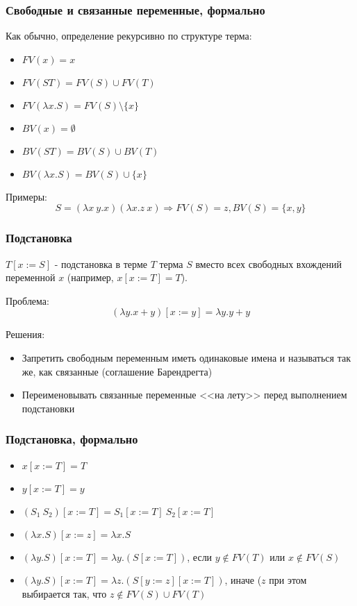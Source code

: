 \documentclass[xetex,mathserif,serif]{beamer}
\begin{document}
	\begin{frame}
		\frametitle{Свободные и связанные переменные, формально}
		Как обычно, определение рекурсивно по структуре терма:
		\begin{itemize}
			\item $FV(x) = x$
			\item $FV(S T) = FV(S) \cup FV(T)$
			\item $FV(\lambda x.S) = FV(S) \setminus \{x\}$
		\end{itemize}

		\begin{itemize}
			\item $BV(x) = \emptyset$
			\item $BV(S T) = BV(S) \cup BV(T)$
			\item $BV(\lambda x.S) = BV(S) \cup \{x\}$
		\end{itemize}
		Примеры:
		$$S = (\lambda x\ y.x) (\lambda x.z\ x) \Rightarrow FV(S) = {z}, BV(S) = \{x,y\}$$
	\end{frame}
	
	\begin{frame}
		\frametitle{Подстановка}
		$T[x := S]$ - подстановка в терме $T$ терма $S$ вместо всех свободных вхождений 
		переменной $x$ (например, $x[x := T] = T$).
		
		Проблема:
		$$(\lambda y.x + y)[x := y] = \lambda y. y + y$$
		
		Решения:
		\begin{itemize}
			\item Запретить свободным переменным иметь одинаковые имена и называться так же, 
					как связанные (соглашение Барендрегта)
			\item Переименовывать связанные переменные <<на лету>> перед выполнением подстановки
		\end{itemize}		
	\end{frame}
	
	\begin{frame}
		\frametitle{Подстановка, формально}
		\begin{itemize}
			\item $x[x := T] = T$
			\item $y[x := T] = y$
			\item $(S_1\ S_2)[x := T] = S_1[x := T]\ S_2[x := T]$
			\item $(\lambda x.S)[x := z] = \lambda x.S$
			\item $(\lambda y.S)[x := T] = \lambda y.(S[x := T])$, если $y \notin FV(T)$ или $x \notin FV(S)$
			\item $(\lambda y.S)[x := T] = \lambda z.(S[y := z][x := T])$, иначе ($z$ при этом выбирается так, 
					что $z \notin FV(S) \cup FV(T)$
		\end{itemize}		
	\end{frame}
		
\end{document}
